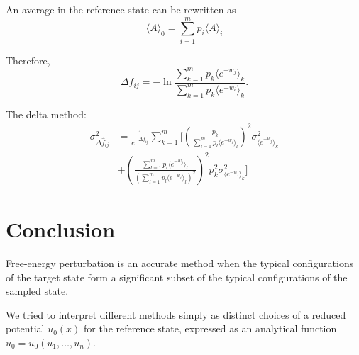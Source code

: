 \documentclass[aip,jcp,preprint,amsmath,amssymb]{revtex4-1}
\begin{document}
An average in the reference state can be rewritten as
\begin{equation}
\label{eq:average_reference_state}
\langle A \rangle_0 = \sum_{i=1}^m p_i \langle A \rangle_i
\end{equation}

Therefore,
\begin{equation*}
\label{eq:mbar_free_energy_difference}
\Delta f_{ij} = - \ln \frac{\sum_{k=1}^m p_k \langle e^{-w_j} \rangle_k}{\sum_{k=1}^m p_k \langle e^{-w_i} \rangle_k}.
\end{equation*}

The delta method:
\begin{align*}
\sigma^2_{\Delta \hat f_{ij}} &= \frac{1}{e^{-\Delta f_{ij}}} \sum_{k=1}^m \Bigg[ \left(\frac{p_k}{\sum_{l=1}^m p_l \langle e^{-w_i} \rangle_l } \right)^2 \sigma^2_{\langle e^{-w_j} \rangle_k} \\
&+ \left( \frac{\sum_{l=1}^m p_l \langle e^{-w_j} \rangle_l}{(\sum_{l=1}^m p_l \langle e^{-w_i} \rangle_l)^2}\right)^2 p_k^2 \sigma^2_{\langle e^{-w_i} \rangle_k} \Bigg]
\end{align*}

\section{Conclusion}

Free-energy perturbation is an accurate method when the typical configurations of the target state form a significant subset of the typical configurations of the sampled state.

We tried to interpret different methods simply as distinct choices of a reduced potential $u_0(x)$ for the reference state, expressed as an analytical function $u_0 = u_0(u_1,\dots,u_n)$.


\end{document}
